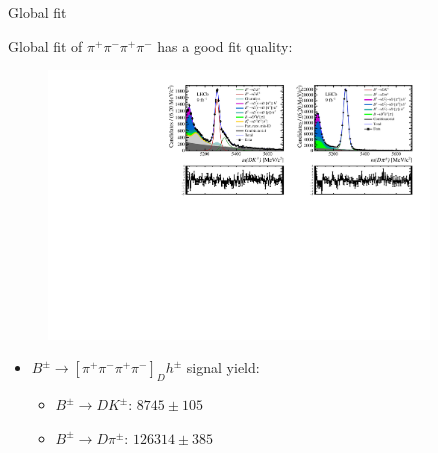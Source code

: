 \documentclass[xcolor={dvipsnames}]{beamer}
\begin{document}
\begin{frame}{Global fit}
  \begin{center}
    {\large Global fit of $\pi^+\pi^-\pi^+\pi^-$ has a good fit quality:}
  \end{center}
  \begin{figure}
    \centering
    \includegraphics[width = 0.9\textwidth,trim={0 0 0 0},clip=true]{Plots/d2pipipipi_fiveL_allDP.pdf}
  \end{figure}
  \vspace{-0.5cm}
  \begin{itemize}
    \item{$B^\pm\to[\pi^+\pi^-\pi^+\pi^-]_Dh^\pm$ signal yield:}
    \begin{itemize}
      \item{$B^\pm\to DK^\pm$: $8745 \pm 105$}
      \item{$B^\pm\to D\pi^\pm$: $126314 \pm 385$}
    \end{itemize}
  \end{itemize}
\end{frame}
\end{document}

